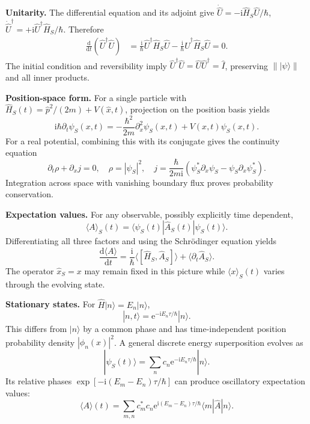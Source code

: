 \documentclass[11pt,a4paper]{article}
\newcommand{\dd}{\mathrm{d}}\newcommand{\iu}{\mathrm{i}}\newcommand{\ee}{\mathrm{e}}
\newcommand{\avg}[1]{\langle #1\rangle}\newcommand{\Sch}{Schr\"odinger}
\newcommand{\bra}[1]{\langle #1|}\newcommand{\ket}[1]{|#1\rangle}
\newcommand{\norm}[1]{\left\lVert#1\right\rVert}
\begin{document}
\textbf{Unitarity.} The differential equation and its adjoint give
\(\dot{\hat U}=-\iu\hat H_S\hat U/\hbar\), \(\dot{\hat U}^\dagger=+\iu\hat U^\dagger\hat H_S/\hbar\). Therefore
\begin{align}
\frac{\dd}{\dd t}(\hat U^\dagger\hat U)&=\frac{\iu}{\hbar}\hat U^\dagger\hat H_S\hat U-\frac{\iu}{\hbar}\hat U^\dagger\hat H_S\hat U=0.
\end{align}
The initial condition and reversibility imply \(\hat U^\dagger\hat U=\hat U\hat U^\dagger=\hat I\), preserving \(\norm{\ket\psi}\) and all inner products.

\textbf{Position-space form.} For a single particle with \(\hat H_S(t)=\hat p^2/(2m)+V(\hat x,t)\), projection on the position basis yields
\begin{equation}\boxed{\iu\hbar\partial_t\psi_S(x,t)=-\frac{\hbar^2}{2m}\partial_x^2\psi_S(x,t)+V(x,t)\psi_S(x,t).}\end{equation}
For a real potential, combining this with its conjugate gives the continuity equation
\begin{equation}\boxed{\partial_t\rho+\partial_xj=0,\quad\rho=|\psi_S|^2,\quad j=\frac{\hbar}{2m\iu}(\psi_S^*\partial_x\psi_S-\psi_S\partial_x\psi_S^*).}\end{equation}
Integration across space with vanishing boundary flux proves probability conservation.

\textbf{Expectation values.} For any observable, possibly explicitly time dependent,
\begin{equation}\boxed{\avg A_S(t)=\bra{\psi_S(t)}\hat A_S(t)\ket{\psi_S(t)}.}\end{equation}
Differentiating all three factors and using the Schr\"odinger equation yields
\begin{equation}\boxed{\frac{\dd\avg A}{\dd t}=\frac{\iu}{\hbar}\avg{[\hat H_S,\hat A_S]}+\avg{\partial_t\hat A_S}.}\end{equation}
The operator \(\hat x_S=x\) may remain fixed in this picture while \(\avg{x}_S(t)\) varies through the evolving state.

\textbf{Stationary states.} For \(\hat H\ket n=E_n\ket n\),
\begin{equation}\boxed{\ket{n,t}=\ee^{-\iu E_n\tau/\hbar}\ket n.}\end{equation}
This differs from \(\ket n\) by a common phase and has time-independent position probability density \(|\phi_n(x)|^2\). A general discrete energy superposition evolves as
\begin{equation}\boxed{\ket{\psi_S(t)}=\sum_nc_n\ee^{-\iu E_n\tau/\hbar}\ket n.}\end{equation}
Its relative phases \(\exp[-\iu(E_m-E_n)\tau/\hbar]\) can produce oscillatory expectation values:
\begin{equation}\avg A(t)=\sum_{m,n}c_m^*c_n\ee^{\iu(E_m-E_n)\tau/\hbar}\bra m\hat A\ket n.\end{equation}
\end{document}
